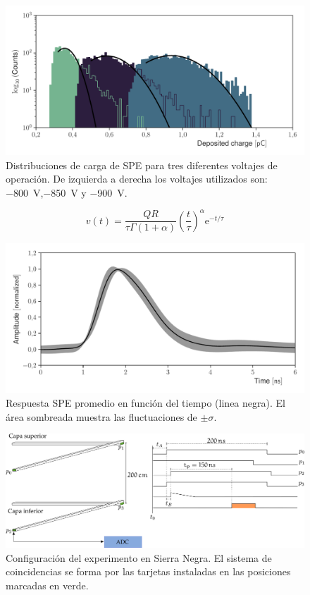 \begin{figure}
        \centering
        \includegraphics[width=\textwidth]{mapmt_charge.pdf}
        \caption{Distribuciones de carga de SPE para tres diferentes voltajes de operación. De izquierda a derecha los voltajes utilizados son: \SI{-800}{\volt},\SI{-850}{\volt} y \SI{-900}{\volt}.}
        \label{fig:mapmt_charge}
\end{figure}

\begin{equation}
\label{equ:sphe}
v(t)=\frac{QR}{\tau\Gamma(1+\alpha)}\left(\frac{t}{\tau}\right)^{\alpha}\mathrm{e}^{-t/\tau}
\end{equation}

\begin{figure}
        \centering
        \includegraphics[width=\textwidth]{sphe-signal.pdf}
        \caption{Respuesta SPE promedio en función del tiempo (linea negra). El área sombreada muestra las fluctuaciones de $\pm\sigma$.}
        \label{fig:sphe}
\end{figure}

\begin{figure}
        \centering
        \includegraphics[width=\textwidth]{muons-experiment.pdf}
        \caption{Configuración del experimento en Sierra Negra. El sistema de coincidencias se forma por las tarjetas instaladas en las posiciones marcadas en verde.}
        \label{fig:muons-experiment}
\end{figure}


